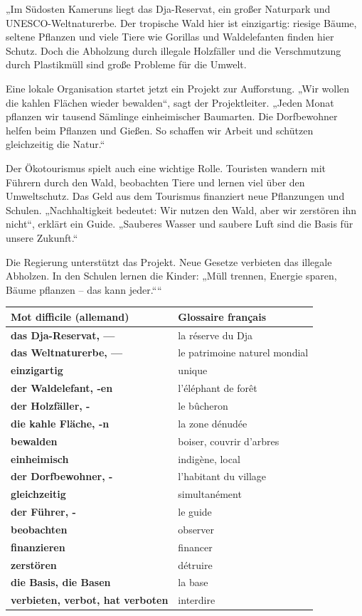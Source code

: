 \documentclass[11pt]{article}
\begin{document}
\begin{textebox}
„Im Südosten Kameruns liegt das Dja-Reservat, ein großer Naturpark und UNESCO-Weltnaturerbe. Der tropische Wald hier ist einzigartig: riesige Bäume, seltene Pflanzen und viele Tiere wie Gorillas und Waldelefanten finden hier Schutz. Doch die Abholzung durch illegale Holzfäller und die Verschmutzung durch Plastikmüll sind große Probleme für die Umwelt.

Eine lokale Organisation startet jetzt ein Projekt zur Aufforstung. „Wir wollen die kahlen Flächen wieder bewalden“, sagt der Projektleiter. „Jeden Monat pflanzen wir tausend Sämlinge einheimischer Baumarten. Die Dorfbewohner helfen beim Pflanzen und Gießen. So schaffen wir Arbeit und schützen gleichzeitig die Natur.“

Der Ökotourismus spielt auch eine wichtige Rolle. Touristen wandern mit Führern durch den Wald, beobachten Tiere und lernen viel über den Umweltschutz. Das Geld aus dem Tourismus finanziert neue Pflanzungen und Schulen. „Nachhaltigkeit bedeutet: Wir nutzen den Wald, aber wir zerstören ihn nicht“, erklärt ein Guide. „Sauberes Wasser und saubere Luft sind die Basis für unsere Zukunft.“

Die Regierung unterstützt das Projekt. Neue Gesetze verbieten das illegale Abholzen. In den Schulen lernen die Kinder: „Müll trennen, Energie sparen, Bäume pflanzen – das kann jeder.““
\end{textebox}

\begin{center}
\begin{tabularx}{\linewidth}{|>{\bfseries}l|X|}
\hline
\rowcolor{popblueL}
\textbf{Mot difficile (allemand)} & \textbf{Glossaire français} \\
\hline
das Dja-Reservat, — & la réserve du Dja \\
\hline
das Weltnaturerbe, — & le patrimoine naturel mondial \\
\hline
einzigartig & unique \\
\hline
der Waldelefant, -en & l'éléphant de forêt \\
\hline
der Holzfäller, - & le bûcheron \\
\hline
die kahle Fläche, -n & la zone dénudée \\
\hline
bewalden & boiser, couvrir d'arbres \\
\hline
einheimisch & indigène, local \\
\hline
der Dorfbewohner, - & l'habitant du village \\
\hline
gleichzeitig & simultanément \\
\hline
der Führer, - & le guide \\
\hline
beobachten & observer \\
\hline
finanzieren & financer \\
\hline
zerstören & détruire \\
\hline
die Basis, die Basen & la base \\
\hline
verbieten, verbot, hat verboten & interdire \\
\hline
\end{tabularx}
\end{center}
\end{document}
